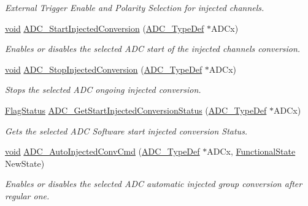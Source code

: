 \begin{DoxyCompactItemize}
\begin{DoxyCompactList}\small\item\em External Trigger Enable and Polarity Selection for injected channels. \end{DoxyCompactList}\item 
\hyperlink{group___n_a_m_e_ga18028b8badbf1ea7e704ccac3c488e82}{void} \hyperlink{group___a_d_c___group6_ga247e283c7c37f4eff3c0b8515cd03b52}{A\-D\-C\-\_\-\-Start\-Injected\-Conversion} (\hyperlink{struct_a_d_c___type_def}{A\-D\-C\-\_\-\-Type\-Def} $\ast$A\-D\-Cx)
\begin{DoxyCompactList}\small\item\em Enables or disables the selected A\-D\-C start of the injected channels conversion. \end{DoxyCompactList}\item 
\hyperlink{group___n_a_m_e_ga18028b8badbf1ea7e704ccac3c488e82}{void} \hyperlink{group___a_d_c___group6_gaa5c10c22746b504d4e0de659098b0fe0}{A\-D\-C\-\_\-\-Stop\-Injected\-Conversion} (\hyperlink{struct_a_d_c___type_def}{A\-D\-C\-\_\-\-Type\-Def} $\ast$A\-D\-Cx)
\begin{DoxyCompactList}\small\item\em Stops the selected A\-D\-C ongoing injected conversion. \end{DoxyCompactList}\item 
\hyperlink{group___exported__types_ga89136caac2e14c55151f527ac02daaff}{Flag\-Status} \hyperlink{group___a_d_c___group6_gad1e5ddd2f0456e50d8d8f6db2bffef3d}{A\-D\-C\-\_\-\-Get\-Start\-Injected\-Conversion\-Status} (\hyperlink{struct_a_d_c___type_def}{A\-D\-C\-\_\-\-Type\-Def} $\ast$A\-D\-Cx)
\begin{DoxyCompactList}\small\item\em Gets the selected A\-D\-C Software start injected conversion Status. \end{DoxyCompactList}\item 
\hyperlink{group___n_a_m_e_ga18028b8badbf1ea7e704ccac3c488e82}{void} \hyperlink{group___a_d_c___group6_ga1ff9c3b8e4bbdd2addfd227f1a506a66}{A\-D\-C\-\_\-\-Auto\-Injected\-Conv\-Cmd} (\hyperlink{struct_a_d_c___type_def}{A\-D\-C\-\_\-\-Type\-Def} $\ast$A\-D\-Cx, \hyperlink{group___exported__types_gac9a7e9a35d2513ec15c3b537aaa4fba1}{Functional\-State} New\-State)
\begin{DoxyCompactList}\small\item\em Enables or disables the selected A\-D\-C automatic injected group conversion after regular one. \end{DoxyCompactList}\item 

\end{DoxyCompactItemize}
